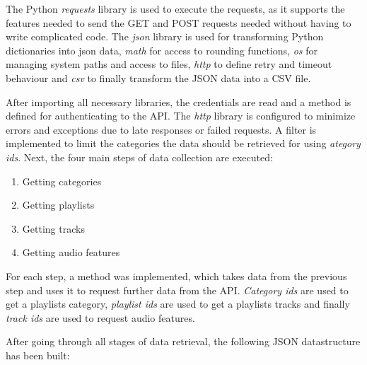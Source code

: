 The Python \emph{requests} library is used to execute the requests, as it supports the features needed to send the GET and POST
requests needed without having to write complicated code.
The \emph{json} library is used for transforming Python dictionaries into json data, \emph{math} for access to rounding functions,
\emph{os} for managing system paths and access to files, \emph{http} to define retry and timeout behaviour and \emph{csv}
to finally transform the JSON data into a CSV file.

After importing all necessary libraries, the credentials are read and a method is defined for authenticating to the API.
The \emph{http} library is configured to minimize errors and exceptions due to late responses or failed requests.
A filter is implemented to limit the categories the data should be retrieved for using \emph{ategory ids}.
Next, the four main steps of data collection are executed:

\begin{enumerate}
    \item Getting categories
    \item Getting playlists
    \item Getting tracks
    \item Getting audio features
\end{enumerate}

For each step, a method was implemented, which takes data from the previous step and uses it to request further data from the
API. \emph{Category ids} are used to get a playlists category, \emph{playlist ids} are used to get a playlists tracks and finally \emph{track ids}
are used to request audio features.

After going through all stages of data retrieval, the following JSON datastructure has been built:

